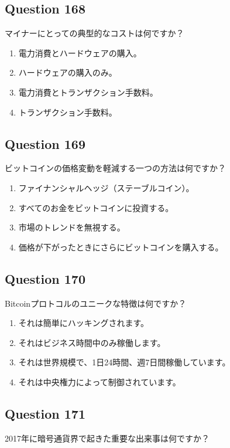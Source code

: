 \documentclass[12pt,a4paper]{article}
\begin{document}
\subsection*{Question 168}
マイナーにとっての典型的なコストは何ですか？

\begin{enumerate}[label=\Alph*., leftmargin=*]
\item 電力消費とハードウェアの購入。
\item ハードウェアの購入のみ。
\item 電力消費とトランザクション手数料。
\item トランザクション手数料。
\end{enumerate}

\bigskip


\subsection*{Question 169}
ビットコインの価格変動を軽減する一つの方法は何ですか？

\begin{enumerate}[label=\Alph*., leftmargin=*]
\item ファイナンシャルヘッジ（ステーブルコイン）。
\item すべてのお金をビットコインに投資する。
\item 市場のトレンドを無視する。
\item 価格が下がったときにさらにビットコインを購入する。
\end{enumerate}

\bigskip


\subsection*{Question 170}
Bitcoinプロトコルのユニークな特徴は何ですか？

\begin{enumerate}[label=\Alph*., leftmargin=*]
\item それは簡単にハッキングされます。
\item それはビジネス時間中のみ稼働します。
\item それは世界規模で、1日24時間、週7日間稼働しています。
\item それは中央権力によって制御されています。
\end{enumerate}

\bigskip


\subsection*{Question 171}
2017年に暗号通貨界で起きた重要な出来事は何ですか？
\end{document}
